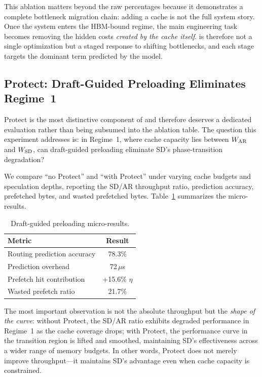 This ablation matters beyond the raw percentages because it demonstrates a complete bottleneck migration chain: adding a cache is not the full system story. Once the system enters the HBM-bound regime, the main engineering task becomes removing the hidden costs \emph{created by the cache itself}. \sysname is therefore not a single optimization but a staged response to shifting bottlenecks, and each stage targets the dominant term predicted by the model.

\subsection{Protect: Draft-Guided Preloading Eliminates Regime~1}

Protect is the most distinctive component of \sysname and therefore deserves a dedicated evaluation rather than being subsumed into the ablation table. The question this experiment addresses is: in Regime~1, where cache capacity lies between $W_{\mathrm{AR}}$ and $W_{\mathrm{SD}}$, can draft-guided preloading eliminate SD's phase-transition degradation?

We compare ``no Protect'' and ``with Protect'' under varying cache budgets and speculation depths, reporting the SD/AR throughput ratio, prediction accuracy, prefetched bytes, and wasted prefetched bytes. Table~\ref{tab:protect} summarizes the micro-results.

\begin{table}[t]
\caption{Draft-guided preloading micro-results.}
\label{tab:protect}
\centering
\small
\begin{tabular}{lc}
\toprule
Metric & Result \\
\midrule
Routing prediction accuracy & 78.3\% \\
Prediction overhead & 72\,$\mu$s \\
Prefetch hit contribution & +15.6\% $\eta$ \\
Wasted prefetch ratio & 21.7\% \\
\bottomrule
\end{tabular}
\end{table}

The most important observation is not the absolute throughput but the \emph{shape of the curve}: without Protect, the SD/AR ratio exhibits degraded performance in Regime~1 as the cache coverage drops; with Protect, the performance curve in the transition region is lifted and smoothed, maintaining SD's effectiveness across a wider range of memory budgets. In other words, Protect does not merely improve throughput---it maintains SD's advantage even when cache capacity is constrained.

